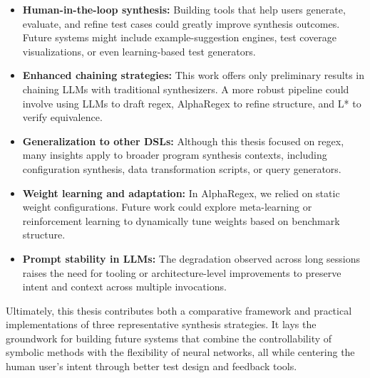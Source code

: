 \begin{itemize}
  \item \textbf{Human-in-the-loop synthesis:} Building tools that help users generate, evaluate, and refine test cases could greatly improve synthesis outcomes. Future systems might include example-suggestion engines, test coverage visualizations, or even learning-based test generators.

  \item \textbf{Enhanced chaining strategies:} This work offers only preliminary results in chaining LLMs with traditional synthesizers. A more robust pipeline could involve using LLMs to draft regex, AlphaRegex to refine structure, and L* to verify equivalence.

  \item \textbf{Generalization to other DSLs:} Although this thesis focused on regex, many insights apply to broader program synthesis contexts, including configuration synthesis, data transformation scripts, or query generators.

  \item \textbf{Weight learning and adaptation:} In AlphaRegex, we relied on static weight configurations. Future work could explore meta-learning or reinforcement learning to dynamically tune weights based on benchmark structure.

  \item \textbf{Prompt stability in LLMs:} The degradation observed across long sessions raises the need for tooling or architecture-level improvements to preserve intent and context across multiple invocations.
\end{itemize}

\indent\indent Ultimately, this thesis contributes both a comparative framework and practical implementations of three representative synthesis strategies. It lays the groundwork for building future systems that combine the controllability of symbolic methods with the flexibility of neural networks, all while centering the human user's intent through better test design and feedback tools.




